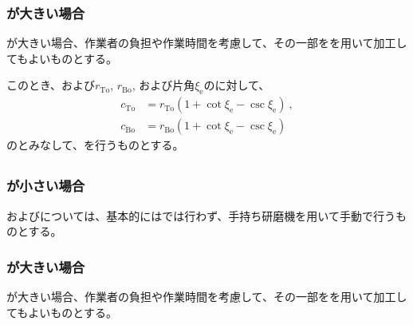 \subsubsection{\EndFaceOutRChamferRadius が大きい場合}
\EndFaceOutRChamferRadius が大きい場合、作業者の負担や作業時間を考慮して、その一部を\TaperEndMill を用いて加工してもよいものとする。

このとき、\TopEndFaceOutRChamferRadius および\BottomEndFaceOutRChamferRadius$r_\mathrm{To}$, $r_\mathrm{Bo}$, および片角$\xi_\mathrm e$の\TaperEndMill に対して、
\begin{align*}
  c_\mathrm{To} &= r_\mathrm{To}\left(1+\cot\xi_\mathrm e-\csc\xi_\mathrm e\right)\ ,\\
  c_\mathrm{Bo} &= r_\mathrm{Bo}\left(1+\cot\xi_\mathrm e-\csc\xi_\mathrm e\right)
\end{align*}
の\EndFaceOutCChamferLength とみなして、\EndFaceInCChamferMilling を行うものとする。


\subsection{\EndFaceInRChamferMilling}

\subsubsection{\EndFaceInRChamferRadius が小さい場合}
\TopEndFaceInRChamferMilling および\BottomEndFaceInRChamferMilling については、基本的には\MMC では行わず、手持ち研磨機を用いて手動で行うものとする。

\subsubsection{\EndFaceInRChamferRadius が大きい場合}
\EndFaceInRChamferRadius が大きい場合、作業者の負担や作業時間を考慮して、その一部を\TaperEndMill を用いて加工してもよいものとする。

